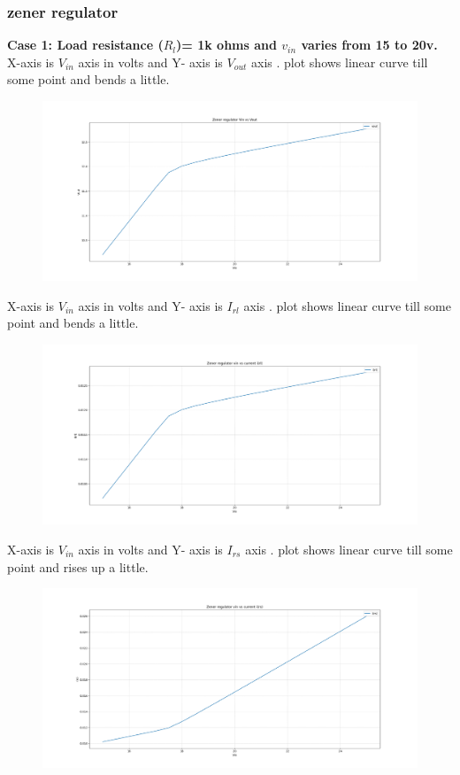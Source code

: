 \documentclass[12pt]{article}
\begin{document}
\subsubsection{zener regulator}
\textbf{Case 1: Load resistance (\(R_{l}\))= 1k ohms and \(v_{in}\) varies from 15 to 20v.\\}
X-axis is \(V_{in}\) axis in volts and Y- axis is \(V_{out}\) axis . plot shows linear curve till some point and bends a little.\\
\begin{figure}[h!]
\centering
\includegraphics[scale = 0.3]{zener_vin_vout_1k.png}
\end{figure}
\newpage
X-axis is \(V_{in}\) axis in volts and Y- axis is \(I_{rl}\) axis . plot shows linear curve till some point and bends a little.\\
\begin{figure}[h!]
\centering
\includegraphics[scale = 0.3]{zener_current_Irl_1k.png}
\end{figure}
\newpage
X-axis is \(V_{in}\) axis in volts and Y- axis is \(I_{rs}\) axis . plot shows linear curve till some point and rises up a little.\\
\begin{figure}[h!]
\centering
\includegraphics[scale = 0.3]{zener_current_Irs_1k.png}
\end{figure}
\end{document}
